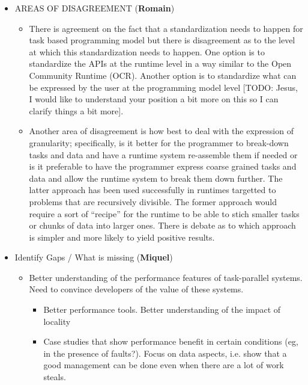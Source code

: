 \begin{itemize}
	\item AREAS OF DISAGREEMENT (\textbf{Romain})
          \begin{itemize}
            \item{
                There is agreement on the fact that a standardization
needs to happen for task based programming model but there is
disagreement as to the level at which this standardization needs to
happen. One option is to standardize the APIs at the runtime level in
a way similar to the Open Community Runtime (OCR). Another option is
to standardize what can be expressed by the user at the programming
model level [TODO: Jesus, I would like to understand your position a
bit more on this so I can clarify things a bit more].
              }
            \item{
                Another area of disagreement is how best to deal with
 the expression of granularity; specifically, is it better for the
 programmer to break-down tasks and data and have a runtime system
 re-assemble them if needed or is it preferable to have the programmer
express coarse grained tasks and data and allow the runtime system to
break them down further. The latter approach has been used
successfully in runtimes targetted to problems that are recursively
divisible. The former approach would require a sort of ``recipe'' for
the runtime to be able to stich smaller tasks or chunks of data into
larger ones. There is debate as to which approach is simpler and more
likely to yield positive results.
              }
            \end{itemize}



	\item Identify Gaps / What is missing  (\textbf{Miquel})
	    \begin{itemize}
		\item Better understanding of the performance features of task-parallel
		systems. Need to convince developers of the value of these systems.
		\begin{itemize}
		  \item Better performance tools. Better understanding of the impact of locality
		  \item Case studies that show performance benefit in certain conditions (eg,
		    in the presence of faults?). Focus on data aspects, i.e. show that
		a good management can be done even when there are a lot of work steals.
	      \end{itemize}
	  \end{itemize}



\end{itemize}
